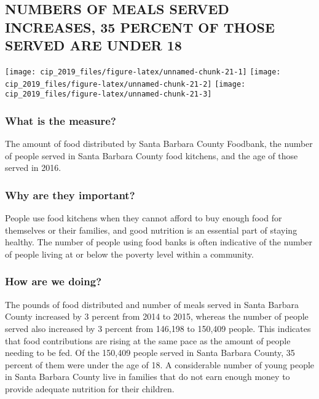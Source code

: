 \documentclass[]{book}
\theoremstyle{definition}
\theoremstyle{definition}
\theoremstyle{definition}
\theoremstyle{remark}
\begin{document}
\subsection*{NUMBERS OF MEALS SERVED INCREASES, 35 PERCENT OF THOSE
SERVED ARE UNDER
18}\label{numbers-of-meals-served-increases-35-percent-of-those-served-are-under-18}

\texttt{[image: cip\_2019\_files/figure-latex/unnamed-chunk-21-1]}
\texttt{[image: cip\_2019\_files/figure-latex/unnamed-chunk-21-2]}
\texttt{[image: cip\_2019\_files/figure-latex/unnamed-chunk-21-3]}

\subsubsection*{What is the measure?}\label{what-is-the-measure-11}

The amount of food distributed by Santa Barbara County Foodbank, the
number of people served in Santa Barbara County food kitchens, and the
age of those served in 2016.

\subsubsection*{Why are they important?}\label{why-are-they-important-1}

People use food kitchens when they cannot afford to buy enough food for
themselves or their families, and good nutrition is an essential part of
staying healthy. The number of people using food banks is often
indicative of the number of people living at or below the poverty level
within a community.

\subsubsection*{How are we doing?}\label{how-are-we-doing-13}

The pounds of food distributed and number of meals served in Santa
Barbara County increased by 3 percent from 2014 to 2015, whereas the
number of people served also increased by 3 percent from 146,198 to
150,409 people. This indicates that food contributions are rising at the
same pace as the amount of people needing to be fed. Of the 150,409
people served in Santa Barbara County, 35 percent of them were under the
age of 18. A considerable number of young people in Santa Barbara County
live in families that do not earn enough money to provide adequate
nutrition for their children.
\end{document}
